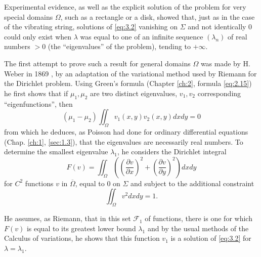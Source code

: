 \documentclass[12pt,a4paper,leqno,twoside]{extbook}
\newcommand{\pder}[2]{\frac{\partial #1}{\partial #2}}
\begin{document}
Experimental evidence, as well as the explicit solution of the problem for very special domains \(\Omega\), such as a rectangle or a disk, showed that, just as in the case of the vibrating string, solutions of \eqref{eq:3.2} vanishing on \(\Sigma\) and not identically 0 could only exist when \(\lambda\) was equal to one of an infinite sequence \((\lambda_n)\) of real numbers \(> 0\) (the ``eigenvalues'' of the problem), tending to \(+\infty\).

The first attempt to prove such a result for general domains \(\Omega\) was made by H. Weber in 1869 \cite{224}, by an adaptation of the variational method used by Riemann for the Dirichlet problem. Using Green's formula (Chapter \ref{ch:2}, formula \eqref{eq:2.15}) he first shows that if \(\mu_1, \mu_2\) are two distinct eigenvalues, \(v_1, v_2\) corresponding ``eigenfunctions'', then
\begin{equation}
    \label{eq:3.3}
    \left(\mu_1 - \mu_2\right) \iint_\Omega v_1(x, y) v_2(x, y) dxdy = 0
\end{equation}
from which he deduces, as Poisson had done for ordinary differential equations (Chap. \ref{ch:1}, \ref{sec:1.3}), that the eigenvalues are necessarily real numbers. To determine the smallest eigenvalue \(\lambda_1\), he considers the Dirichlet integral
\begin{equation}
    \label{eq:3.4}
    F(v) = \iint_\Omega \left( \left(\pder{v}{x}\right)^2 + \left(\pder{v}{y}\right)^2 \right) dxdy
\end{equation}
for \(C^2\) functions \(v\) in \(\overline\Omega\), equal to 0 on \(\Sigma\) and subject to the additional constraint
\begin{equation}
    \label{eq:3.5}
    \iint_\Omega v^2 dxdy = 1.
\end{equation}

He assumes, as Riemann, that in this set \(\mathcal{F}_1\) of functions, there is one for which \(F(v)\) is equal to its greatest lower bound \(\lambda_1\) and by the usual methods of the Calculus of variations, he shows that this function \(v_1\) is a solution of \eqref{eq:3.2} for \(\lambda = \lambda_1\).
\end{document}
